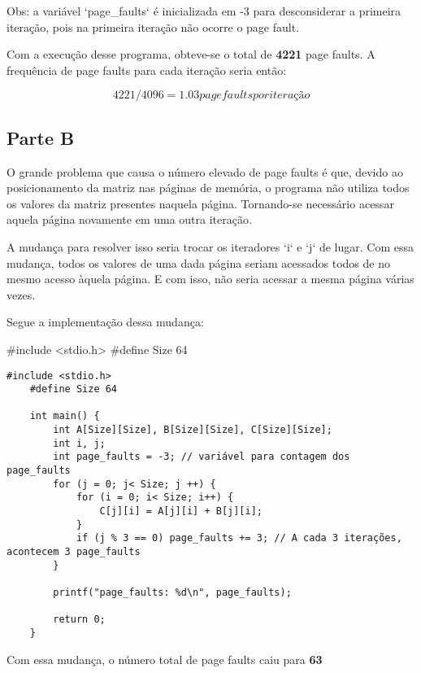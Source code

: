 Obs: a variável `page_faults` é inicializada em -3 para
 desconsiderar a primeira iteração, pois na primeira iteração
 não ocorre o page fault. 

Com a execução desse programa, obteve-se o total de \textbf{4221}
 page faults. A frequência de page faults para cada iteração seria então:

 \[4221/4096 = 1.03 page faults por iteração\]



\subsection*{Parte B}

O grande problema que causa o número elevado de page faults é que,
 devido ao posicionamento da matriz nas páginas de memória, o
 programa não utiliza todos os valores da matriz presentes naquela
 página. Tornando-se necessário acessar aquela página novamente
 em uma outra iteração.

A mudança para resolver isso seria trocar os iteradores `i` e `j` de lugar.
 Com essa mudança, todos os valores de uma dada página seriam acessados todos de
 no mesmo acesso àquela página. E com isso, não seria acessar a mesma
 página várias vezes.

Segue a implementação dessa mudança:

#include <stdio.h>
#define Size 64

\begin{lstlisting}[style=CStyle]
    #include <stdio.h>
    #define Size 64
    
    int main() {
        int A[Size][Size], B[Size][Size], C[Size][Size];
        int i, j;
        int page_faults = -3; // variável para contagem dos page_faults
        for (j = 0; j< Size; j ++) {
            for (i = 0; i< Size; i++) {
                C[j][i] = A[j][i] + B[j][i];
            }
            if (j % 3 == 0) page_faults += 3; // A cada 3 iterações, acontecem 3 page_faults
        }
    
        printf("page_faults: %d\n", page_faults);
    
        return 0;
    }
\end{lstlisting}

Com essa mudança, o número total de page
 faults caiu para \textbf{63}